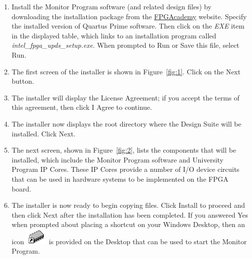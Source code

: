 \documentclass[11pt, twoside, pdftex]{article}
\begin{document}
\begin{enumerate}
\item Install the Monitor Program software (and related design files) by downloading the 
installation package from the 
\href{https://www.fpgacademy.org/tools.html}{FPGAcademy} website.
Specify the installed version of Quartus Prime software.
Then click on the {\it EXE} item in the displayed table, 
which links to an installation program called 
{\it intel\_fpga\_upds\_setup.exe}. When prompted to 
{\sf Run} or {\sf Save} this file, select {\sf Run}.
		  
\item The first screen of the installer is shown in Figure~\ref{fig:1}.
Click on the {\sf Next} button.

 \item The installer will display the License Agreement; if you accept the terms of this agreement, then click {\sf I Agree} to
continue.
	
\item The installer now displays the root directory where the
{\teamname} Design Suite will be installed.  
Click {\sf Next}.

\item The next screen, shown in Figure~\ref{fig:2}, lists the components that will be installed, which include the Monitor Program
software and University Program IP Cores. These IP Cores provide
a number of I/O device circuits that can be used in hardware
systems to be implemented on the FPGA board.

\item The installer is now ready to begin copying files. 
Click {\sf Install} to proceed and then click {\sf Next} after
the installation has been completed. 
If you answered {\sf Yes} when prompted about placing a shortcut on your Windows Desktop, then an icon 
\hbox{\includegraphics[scale=0.65]{images/img_shortcut_sm.png}}
is provided on the Desktop that can be used to start the Monitor
Program.


\end{enumerate}
\end{document}

